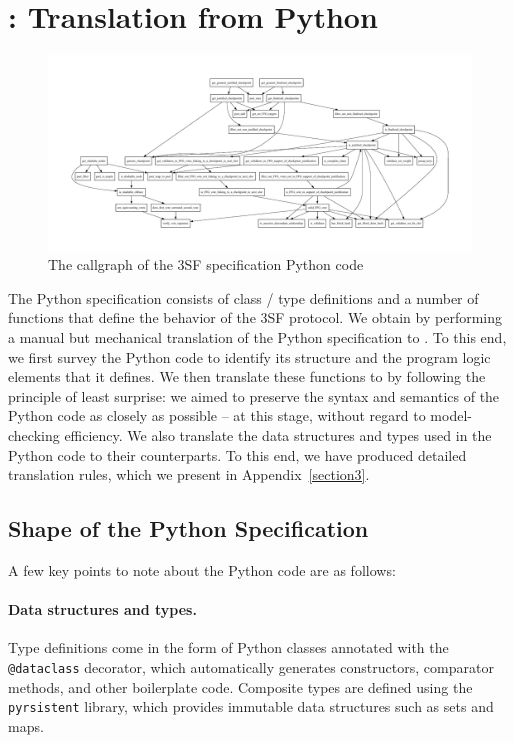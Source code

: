 
\section{\SpecOne{}: Translation from Python}\label{sec:spec1}

\begin{figure}
    \centering
    \includegraphics[width=.9\textheight,angle=-90]{ffg-callgraph.pdf}
    \caption{The callgraph of the 3SF specification Python code}
    \label{fig:callgraph}
\end{figure}

The Python specification consists of class / type definitions and a number of
functions that define the behavior of the 3SF protocol. We obtain \SpecOne{} by
performing a manual but mechanical translation of the Python specification to
\tlap{}. To this end, we first survey the Python code to identify its structure
and the program logic elements that it defines. We then translate these
functions to \tlap{} by following the principle of least surprise: we aimed to
preserve the syntax and semantics of the Python code as closely as possible --
at this stage, without regard to model-checking efficiency. We also translate
the data structures and types used in the Python code to their \tlap{}
counterparts. To this end, we have produced detailed translation rules, which we
present in Appendix~\ref{section3}.

\subsection{Shape of the Python Specification}

A few key points to note about the Python code are as follows:

\paragraph{Data structures and types.} Type definitions come in the form of
Python classes annotated with the \texttt{@dataclass} decorator, which
automatically generates constructors, comparator methods, and other boilerplate
code. Composite types are defined using the \texttt{pyrsistent} library, which
provides immutable data structures such as sets and maps.

